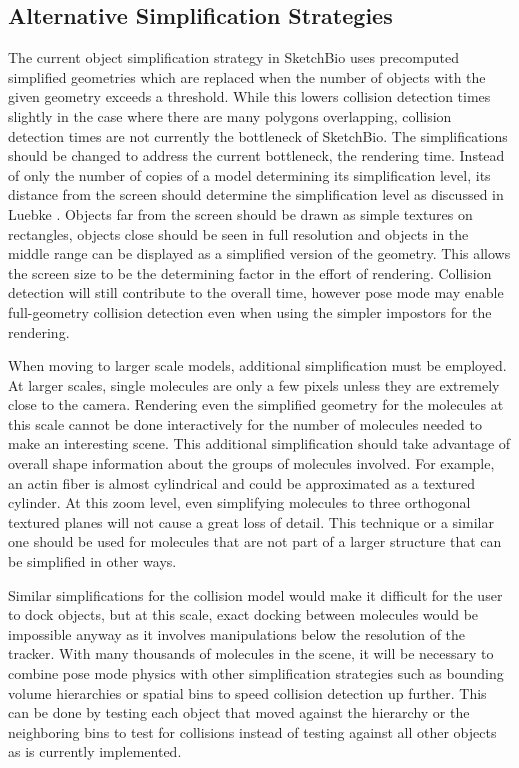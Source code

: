 \documentclass{article} %
\begin{document}
\subsection{Alternative Simplification Strategies}
\label{sec:simplification_strategies}
The current object simplification strategy in SketchBio uses precomputed simplified geometries which are replaced when the number of objects with the given geometry exceeds a threshold.  While this lowers collision detection times slightly in the case where there are many polygons overlapping, collision detection times are not currently the bottleneck of SketchBio.  The simplifications should be changed to address the current bottleneck, the rendering time.  Instead of only the number of copies of a model determining its simplification level, its distance from the screen should determine the simplification level as discussed in Luebke \cite{luebke2003level}.  Objects far from the screen should be drawn as simple textures on rectangles, objects close should be seen in full resolution and objects in the middle range can be displayed as a simplified version of the geometry.  This allows the screen size to be the determining factor in the effort of rendering.  Collision detection will still contribute to the overall time, however pose mode may enable full-geometry collision detection even when using the simpler impostors for the rendering.

When moving to larger scale models, additional simplification must be employed.  At larger scales, single molecules are only a few pixels unless they are extremely close to the camera.  Rendering even the simplified geometry for the molecules at this scale cannot be done interactively for the number of molecules needed to make an interesting scene.  This additional simplification should take advantage of overall shape information about the groups of molecules involved.  For example, an actin fiber is almost cylindrical and could be approximated as a textured cylinder.  At this zoom level, even simplifying molecules to three orthogonal textured planes will not cause a great loss of detail.  This technique or a similar one should be used for molecules that are not part of a larger structure that can be simplified in other ways.

Similar simplifications for the collision model would make it difficult for the user to dock objects, but at this scale, exact docking between molecules would be impossible anyway as it involves manipulations below the resolution of the tracker.  With many thousands of molecules in the scene, it will be necessary to combine pose mode physics with other simplification strategies such as bounding volume hierarchies or spatial bins to speed collision detection up further.  This can be done by testing each object that moved against the hierarchy or the neighboring bins to test for collisions instead of testing against all other objects as is currently implemented.
\end{document}
